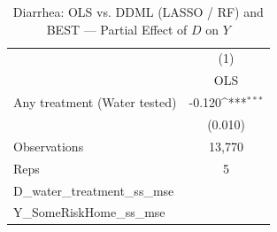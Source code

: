 \begin{table}[htbp]\centering
\def\sym#1{\ifmmode^{#1}\else\(^{#1}\)\fi}
\caption{Diarrhea: OLS vs. DDML (LASSO / RF) and BEST — Partial Effect of $D$ on $Y$}
\begin{tabular}{l*{1}{c}}
\toprule
                &\multicolumn{1}{c}{(1)}\\
                &\multicolumn{1}{c}{OLS}\\
\midrule
Any treatment (Water tested)&   -0.120\sym{***}\\
                &  (0.010)         \\
\midrule
Observations    &   13,770         \\
Reps            &        5         \\
D\_water\_treatment\_ss\_mse&                  \\
Y\_SomeRiskHome\_ss\_mse&                  \\
\bottomrule
\end{tabular}
\end{table}
